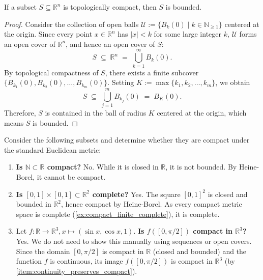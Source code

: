 \begin{proposition}
\label{prop:topologically_compact_is_bounded}
If a subset $S \subseteq \mathbb{R}^n$ is topologically compact, then $S$ is bounded.
\end{proposition}

\begin{proof}
Consider the collection of open balls $\mathcal{U} := \{B_k(0) \mid k \in \mathbb{N}_{\ge 1}\}$ centered at the origin. Since every point $x \in \mathbb{R}^n$ has $|x| < k$ for some large integer $k$, $\mathcal{U}$ forms an open cover of $\mathbb{R}^n$, and hence an open cover of $S$:
\[
S \;\subseteq\; \mathbb{R}^n \;=\; \bigcup_{k=1}^\infty B_k(0).
\]
By topological compactness of $S$, there exists a finite subcover $\{B_{k_1}(0), B_{k_2}(0), \dots, B_{k_m}(0)\}$. Setting $K := \max\{k_1, k_2, \dots, k_m\}$, we obtain
\[
S \;\subseteq\; \bigcup_{j=1}^m B_{k_j}(0) \;=\; B_K(0).
\]
Therefore, $S$ is contained in the ball of radius $K$ centered at the origin, which means $S$ is bounded.
\end{proof}

\begin{example}
\label{ex:compactness_heine_borel_examples}
Consider the following subsets and determine whether they are compact under the standard Euclidean metric:
\begin{enumerate}[label=\textbf{(\alph*)}]
  \item \textbf{Is $\mathbb{N} \subset \mathbb{R}$ compact?} No. While it is closed in $\mathbb{R}$, it is not bounded. By Heine-Borel, it cannot be compact.
  \item \textbf{Is $[0,1] \times [0,1] \subset \mathbb{R}^2$ complete?} Yes. The square $[0,1]^2$ is closed and bounded in $\mathbb{R}^2$, hence compact by Heine-Borel. As every compact metric space is complete (\cref{ex:compact_finite_complete}), it is complete.
  \item Let $f: \mathbb{R} \to \mathbb{R}^3, x \mapsto (\sin x, \cos x, 1)$. \textbf{Is $f([0,\pi/2])$ compact in $\mathbb{R}^3$?} Yes. We do not need to show this manually using sequences or open covers. Since the domain $[0,\pi/2]$ is compact in $\mathbb{R}$ (closed and bounded) and the function $f$ is continuous, its image $f([0,\pi/2])$ is compact in $\mathbb{R}^3$ (by \cref{item:continuity_preserves_compact}).
\end{enumerate}
\end{example}


